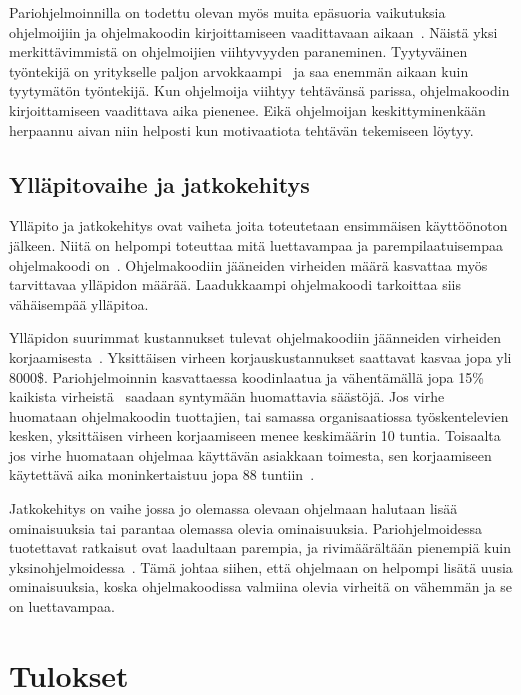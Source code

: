 \documentclass[finnish]{tktltiki2}
\theoremstyle{definition}
\theoremstyle{remark}
\begin{document}
Pariohjelmoinnilla on todettu olevan myös muita epäsuoria vaikutuksia ohjelmoijiin ja ohjelmakoodin kirjoittamiseen vaadittavaan aikaan~\cite{case}. Näistä yksi merkittävimmistä on ohjelmoijien viihtyvyyden paraneminen. Tyytyväinen työntekijä on yritykselle paljon arvokkaampi~\cite{airo2008oma} ja saa enemmän aikaan kuin tyytymätön työntekijä. Kun ohjelmoija viihtyy tehtävänsä parissa, ohjelmakoodin kirjoittamiseen vaadittava aika pienenee. Eikä ohjelmoijan keskittyminenkään herpaannu aivan niin helposti kun motivaatiota tehtävän tekemiseen löytyy.

\subsection{Ylläpitovaihe ja jatkokehitys}

Ylläpito ja jatkokehitys ovat vaiheta joita toteutetaan ensimmäisen käyttöönoton jälkeen. Niitä on helpompi toteuttaa mitä luettavampaa ja parempilaatuisempaa ohjelmakoodi on~\cite{costandbenefit2}. Ohjelmakoodiin jääneiden virheiden määrä kasvattaa myös tarvittavaa ylläpidon määrää. Laadukkaampi ohjelmakoodi tarkoittaa siis vähäisempää ylläpitoa.

Ylläpidon suurimmat kustannukset tulevat ohjelmakoodiin jäänneiden virheiden korjaamisesta~\cite{humphrey1994disciplined}. Yksittäisen virheen korjauskustannukset saattavat kasvaa jopa yli 8000\$. Pariohjelmoinnin kasvattaessa koodinlaatua ja vähentämällä jopa 15\% kaikista virheistä~\cite{costandbenefit2} saadaan syntymään huomattavia säästöjä. Jos virhe huomataan ohjelmakoodin tuottajien, tai samassa organisaatiossa työskentelevien kesken, yksittäisen virheen korjaamiseen menee keskimäärin 10 tuntia. Toisaalta jos virhe huomataan ohjelmaa käyttävän asiakkaan toimesta, sen korjaamiseen käytettävä aika moninkertaistuu jopa 88 tuntiin~\cite{humphrey1994disciplined}.

Jatkokehitys on vaihe jossa jo olemassa olevaan ohjelmaan halutaan lisää ominaisuuksia tai parantaa olemassa olevia ominaisuuksia. Pariohjelmoidessa tuotettavat ratkaisut ovat laadultaan parempia, ja rivimäärältään pienempiä kuin yksinohjelmoidessa~\cite{costandbenefit2}. Tämä johtaa siihen, että ohjelmaan on helpompi lisätä uusia ominaisuuksia, koska ohjelmakoodissa valmiina olevia virheitä on vähemmän ja se on luettavampaa.

\section{Tulokset}
\end{document}
